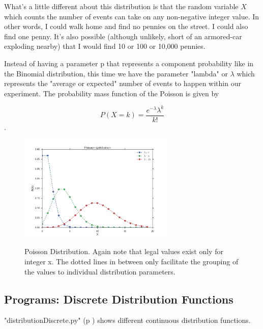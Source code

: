 What's a little different about this distribution is that the random variable $X$ which counts the number of events can take on any non-negative integer value. In other words, I could walk home and find no pennies on the street. I could also find one penny. It's also possible (although unlikely, short of an armored-car exploding nearby) that I would find 10 or 100 or 10,000 pennies.

Instead of having a parameter p that represents a component probability like in the Binomial distribution, this time we have the parameter "lambda" or $\lambda$ which represents the "average or expected" number of events to happen within our experiment. The probability mass function of the Poisson is given by

\begin{equation}
  P(X=k)=\frac{e^{-\lambda}\lambda^k}{k!}
\end{equation}.

\begin{figure}
  \centering
  \includegraphics[width=0.66\textwidth]{../Images/Poisson_distribution_pmf.png}\\
  \caption{Poisson Distribution. Again note that legal values exist only for integer x. The dotted lines in between only facilitate the grouping of the values to individual distribution parameters.}
\end{figure}

\subsection{Programs: Discrete Distribution Functions} 

\vspace{5 mm}

\PyImg "distributionDiscrete.py" (p \pageref{py:discrete}) shows different continuous distribution functions.


